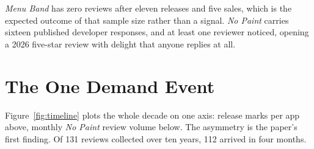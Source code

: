 \documentclass[10pt,letterpaper,twocolumn]{article}
\begin{document}
\emph{Menu Band} has zero reviews after eleven releases and five sales,
which is the expected outcome of that sample size rather than a signal.
\emph{No Paint} carries sixteen published developer responses, and at
least one reviewer noticed, opening a 2026 five-star review with delight
that anyone replies at all.

\section{The One Demand Event}
\label{sec:demand}

Figure~\ref{fig:timeline} plots the whole decade on one axis: release
marks per app above, monthly \emph{No Paint} review volume below. The
asymmetry is the paper's first finding. Of 131 reviews collected over ten
years, 112 arrived in four months.
\end{document}
